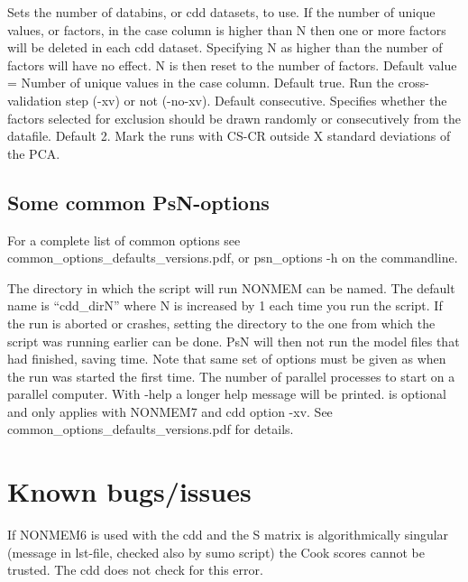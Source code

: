 \begin{optionlist}
Sets the number of databins, or cdd datasets, to use. If the number of unique values, or factors, in the case column is higher than N then one or more factors will be deleted in each cdd dataset. Specifying N as higher than the number of factors will have no effect. N is then reset to the number of factors. Default value = Number of unique values in the case column. 
\nextopt
{}
Default true. Run the cross-validation step (-xv) or not (-no-xv). 
\nextopt
{}
Default consecutive. Specifies whether the factors selected for exclusion should be drawn randomly or consecutively from the datafile. 
\nextopt
{}
Default 2. Mark the runs with CS-CR outside X standard deviations of the PCA. 
\nextopt
\end{optionlist}

\subsection{Some common PsN-options}

For a complete list of common options see common\_options\_defaults\_versions.pdf, or psn\_options -h on the commandline.

\begin{optionlist}
The directory in which the script will run NONMEM can be named. The default name is “cdd\_dirN” where N is increased by 1 each time you run the script. If the run is aborted or crashes, setting the directory to the one from which the script was running earlier can be done. PsN will then not run the model files that had finished, saving time. Note that same set of options must be given as when the run was started the first time. 
\nextopt
{}
The number of parallel processes to start on a parallel computer. 
\nextopt
{}
With -help a longer help message will be printed. 
\nextopt
{}
is optional and only applies with NONMEM7 and cdd option -xv. See common\_options\_defaults\_versions.pdf for details.

\nextopt
\end{optionlist}


\section{Known bugs/issues}

If NONMEM6 is used with the cdd and the S matrix is algorithmically singular (message in lst-file, checked also by sumo script) the Cook scores cannot  be trusted. The cdd does not check for this error. 


